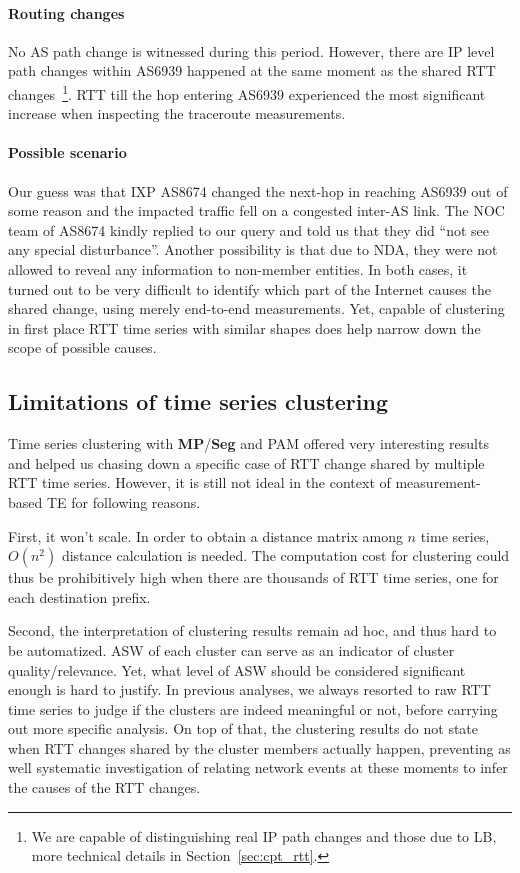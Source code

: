 \paragraph*{Routing changes} No AS path change is witnessed during this period.
However, there are IP level path changes within AS6939 happened at the same moment as the shared RTT changes~\footnote{We are capable of distinguishing real IP path changes and those due to \ac{LB}, more technical details in Section~\ref{sec:cpt_rtt}.}.
RTT till the hop entering AS6939 experienced the most significant increase when inspecting the traceroute measurements.

\paragraph*{Possible scenario} Our guess was that IXP AS8674 changed the next-hop in reaching AS6939 out of some reason and the impacted traffic fell on a congested inter-AS link.
The \acf{NOC} team of AS8674 kindly replied to our query and told us that they did ``not see any special disturbance''. 
Another possibility is that due to \acf{NDA}, they were not allowed to reveal any information to non-member entities.
In both cases, it turned out to be very difficult to identify which part of the Internet causes the shared change, using merely end-to-end measurements.
Yet, capable of clustering in first place RTT time series with similar shapes does help narrow down the scope of possible causes.

\subsection{Limitations of time series clustering}

Time series clustering with \textbf{MP}/\textbf{Seg} and \ac{PAM} offered very interesting results and helped us chasing down a specific case of RTT change shared by multiple RTT time series.
However, it is still not ideal in the context of measurement-based TE for following reasons.

First, it won't scale. In order to obtain a distance matrix among $n$ time series, $O(n^2)$ distance calculation is needed. The computation cost for clustering could thus be prohibitively high when there are thousands of RTT time series, one for each destination prefix. 

Second, the interpretation of clustering results remain ad hoc, and thus hard to be automatized. \ac{ASW} of each cluster can serve as an indicator of cluster quality/relevance. Yet, what level of \ac{ASW} should be considered significant enough is hard to justify. In previous analyses, we always resorted to raw RTT time series to judge if the clusters are indeed meaningful or not, before carrying out more specific analysis. On top of that, the clustering results do not state when RTT changes shared by the cluster members actually happen, preventing as well systematic investigation of relating network events at these moments to infer the causes of the RTT changes.

